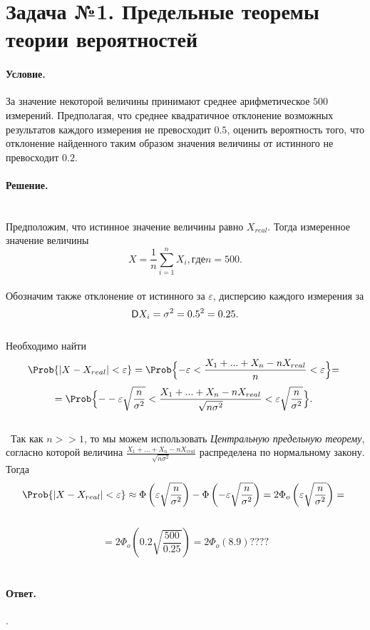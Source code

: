 
\section{Задача №1. Предельные теоремы теории вероятностей}

\paragraph{Условие.} За значение некоторой величины принимают среднее арифметическое $500$ измерений. Предполагая, что среднее квадратичное отклонение возможных результатов каждого измерения не превосходит $0.5$, оценить вероятность того, что отклонение найденного таким образом значения величины от истинного не превосходит $0.2$.

\paragraph{Решение.}\hfill\\
Предположим, что истинное значение величины равно $X_{real}.$ Тогда измеренное значение величины
 \[
 	X = \frac{1}{n}\sum_{i=1}^n X_{i}, где n=500. 
\]
\\
Обозначим также отклонение от истинного за $\varepsilon$, дисперсию каждого измерения за 
\[
	\mathsf{D} X_{i}=\sigma^2=0.5^2=0.25.
\]
\\
Необходимо найти 
\[
    \Prob\{|X-X_{real}| < \varepsilon\} =  \Prob \Bigl\{-\varepsilon < \frac{X_{1}+ ... + X_{n} - nX_{real}}{n} < \varepsilon \Bigl\} = 
 \]
\[
    = \Prob\Bigl\{--\varepsilon  \sqrt{\frac{n}{\sigma^2}} < \frac{X_{1}+ ... + X_{n} - nX_{real}}{\sqrt{n\sigma^2}} < \varepsilon  \sqrt{\frac{n}{\sigma^2}}\Bigl\} .
 \]
 \\
 Так как $n >> 1$, то мы можем использовать \emph{Центральную предельную теорему}, согласно которой величина $\frac{X_{1}+ ... + X_{n} - nX_{real}}{\sqrt{n\sigma^2}}$ распределена по нормальному закону. Тогда
 \[
	\Prob\{|X-X_{real}| < \varepsilon\} \approx \Phi \left(\varepsilon \sqrt{\frac{n}{\sigma^2}}\right) - \Phi \left(- \varepsilon \sqrt{\frac{n}{\sigma^2}}\right) =
	2\Phi_{o} \left(\varepsilon \sqrt{\frac{n}{\sigma^2}}\right) = 
 \]
 
 \[
  = 2\Phi_{o} \left(0.2 \sqrt{\frac{500}{0.25}}\right) = 2\Phi_{o} \left( 8.9 \right)  ????
 \]
 		
 



\noindent

\paragraph{Ответ.} .